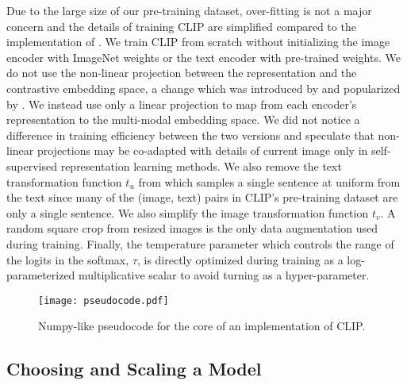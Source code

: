 \documentclass{article}
\begin{document}
Due to the large size of our pre-training dataset, over-fitting is not a major concern and the details of training CLIP are simplified compared to the implementation of \citet{zhang2020contrastive}. We train CLIP from scratch without initializing the image encoder with ImageNet weights or the text encoder with pre-trained weights. We do not use the non-linear projection between the representation and the contrastive embedding space, a change which was introduced by \citet{bachman2019learning} and popularized by \citet{chen2020simple}. We instead use only a linear projection to map from each encoder's representation to the multi-modal embedding space. We did not notice a difference in training efficiency between the two versions and speculate that non-linear projections may be co-adapted with details of current image only in self-supervised representation learning methods. We also remove the text transformation function $t_u$ from \citet{zhang2020contrastive} which samples a single sentence at uniform from the text since many of the (image, text) pairs in CLIP's pre-training dataset are only a single sentence. We also simplify the image transformation function $t_v$. A random square crop from resized images is the only data augmentation used during training. Finally, the temperature parameter which controls the range of the logits in the softmax, $\tau$, is directly optimized during training as a log-parameterized multiplicative scalar to avoid turning as a hyper-parameter.

\begin{figure}[t]
\begin{center}
\centerline{\texttt{[image: pseudocode.pdf]}}
\caption{Numpy-like pseudocode for the core of an implementation of CLIP.}
\label{pseudocode}
\end{center}
\vspace{-1em}
\end{figure}


























\subsection{Choosing and Scaling a Model}
\end{document}
